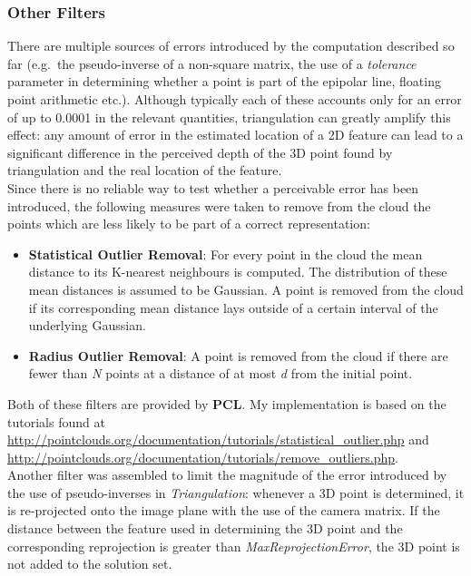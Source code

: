 \documentclass[12pt,a4paper,twoside,openright]{report}
\begin{document}
\subsubsection{Other Filters}
There are multiple sources of errors introduced by the computation described so far (e.g.\ the pseudo-inverse of a non-square matrix, the use of a \emph{tolerance} parameter in determining whether a point is part of the epipolar line, floating point arithmetic etc.). Although typically each of these accounts only for an error of up to 0.0001 in the relevant quantities, triangulation can greatly amplify this effect: any amount of error in the estimated location of a 2D feature can lead to a significant difference in the perceived depth of the 3D point found by triangulation and the real location of the feature.\\
Since there is no reliable way to test whether a perceivable error has been introduced, the following measures were taken to remove from the cloud the points which are less likely to be part of a correct representation:
\begin{itemize}
\item \textbf{Statistical Outlier Removal}: For every point in the cloud the mean distance to its K-nearest neighbours is computed. The distribution of these mean distances is assumed to be Gaussian. A point is removed from the cloud if its corresponding mean distance lays outside of a certain interval of the underlying Gaussian.  
\item \textbf{Radius Outlier Removal}: A point is removed from the cloud if there are fewer than \emph{N} points at a distance of at most \emph{d} from the initial point. 
\end{itemize}
Both of these filters are provided by \textbf{PCL}. My implementation is based on the tutorials found at \url{http://pointclouds.org/documentation/tutorials/statistical_outlier.php} and \url{http://pointclouds.org/documentation/tutorials/remove_outliers.php}.\\
\linebreak
Another filter was assembled to limit the magnitude of the error introduced by the use of pseudo-inverses in \emph{Triangulation}: whenever a 3D point is determined, it is re-projected onto the image plane with the use of the camera matrix. If the distance between the feature used in determining the 3D point and the corresponding reprojection is greater than \emph{MaxReprojectionError}, the 3D point is not added to the solution set. 
\end{document}
